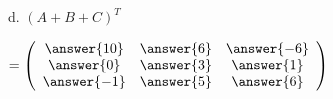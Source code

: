 \documentclass{ximera}
\begin{document}
\begin{exercise}
d. $\left(A + B + C\right)^{T} $ \begin{prompt} $ = \left(\begin{array}{ccc}
\answer{10} & \answer{6} & \answer{-6}\\
\answer{0} & \answer{3} & \answer{1}\\
\answer{-1} & \answer{5} & \answer{6}
\end{array}\right)$
\end{prompt}



























\end{exercise}
\end{document}
